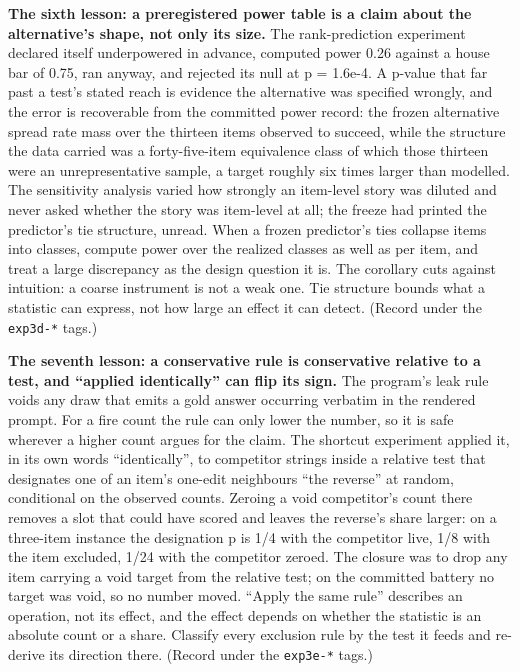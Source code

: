 \textbf{The sixth lesson: a preregistered power table is a claim about the
alternative's shape, not only its size.} The rank-prediction
experiment declared itself underpowered in advance, computed power
0.26 against a house bar of 0.75, ran anyway, and rejected its null at
p = 1.6e-4. A p-value that far past a test's stated reach is evidence
the alternative was specified wrongly, and the error is recoverable
from the committed power record: the frozen alternative spread rate
mass over the thirteen items observed to succeed, while the structure
the data carried was a forty-five-item equivalence class of which
those thirteen were an unrepresentative sample, a target roughly six
times larger than modelled. The sensitivity analysis varied how
strongly an item-level story was diluted and never asked whether the
story was item-level at all; the freeze had printed the predictor's
tie structure, unread. When a frozen predictor's ties collapse items
into classes, compute power over the realized classes as well as per
item, and treat a large discrepancy as the design question it is. The
corollary cuts against intuition: a coarse instrument is not a weak
one. Tie structure bounds what a statistic can express, not how large
an effect it can detect. (Record under the \texttt{exp3d-*} tags.)

\textbf{The seventh lesson: a conservative rule is conservative relative to
a test, and ``applied identically'' can flip its sign.} The program's
leak rule voids any draw that emits a gold answer occurring verbatim
in the rendered prompt. For a fire count the rule can only lower the
number, so it is safe wherever a higher count argues for the claim.
The shortcut experiment applied it, in its own words ``identically'',
to competitor strings inside a relative test that designates one of an
item's one-edit neighbours ``the reverse'' at random, conditional on the
observed counts. Zeroing a void competitor's count there removes a
slot that could have scored and leaves the reverse's share larger: on
a three-item instance the designation p is 1/4 with the competitor
live, 1/8 with the item excluded, 1/24 with the competitor zeroed. The
closure was to drop any item carrying a void target from the relative
test; on the committed battery no target was void, so no number moved.
``Apply the same rule'' describes an operation, not its effect, and the
effect depends on whether the statistic is an absolute count or a
share. Classify every exclusion rule by the test it feeds and
re-derive its direction there. (Record under the \texttt{exp3e-*} tags.)


